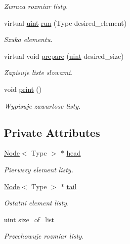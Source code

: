 \begin{DoxyCompactItemize}
\begin{DoxyCompactList}\small\item\em Zwraca rozmiar listy. \end{DoxyCompactList}\item 
virtual \hyperlink{_i_lista_8h_a91ad9478d81a7aaf2593e8d9c3d06a14}{uint} \hyperlink{class_lista_a5b2885df007727df930fc293ef2ab2b2}{run} (Type desired\-\_\-element)
\begin{DoxyCompactList}\small\item\em Szuka elementu. \end{DoxyCompactList}\item 
virtual void \hyperlink{class_lista_a28b2f7513f4ec6596463f2b60f2a753b}{prepare} (\hyperlink{_i_lista_8h_a91ad9478d81a7aaf2593e8d9c3d06a14}{uint} desired\-\_\-size)
\begin{DoxyCompactList}\small\item\em Zapisuje liste slowami. \end{DoxyCompactList}\item 
void \hyperlink{class_lista_acfeb35d442b628fbcfb4db31e6acea16}{print} ()
\begin{DoxyCompactList}\small\item\em Wypisuje zawartosc listy. \end{DoxyCompactList}\end{DoxyCompactItemize}
\subsection*{Private Attributes}
\begin{DoxyCompactItemize}
\item 
\hyperlink{class_node}{Node}$<$ Type $>$ $\ast$ \hyperlink{class_lista_a9024fb7afb23ca1658288623fb940727}{head}
\begin{DoxyCompactList}\small\item\em Pierwszy element listy. \end{DoxyCompactList}\item 
\hyperlink{class_node}{Node}$<$ Type $>$ $\ast$ \hyperlink{class_lista_a510db6c07e6aa5802176451632f6bf4c}{tail}
\begin{DoxyCompactList}\small\item\em Ostatni element listy. \end{DoxyCompactList}\item 
\hyperlink{_i_lista_8h_a91ad9478d81a7aaf2593e8d9c3d06a14}{uint} \hyperlink{class_lista_a2ccdeaf5854898d0ba0fce725e0fa676}{size\-\_\-of\-\_\-list}
\begin{DoxyCompactList}\small\item\em Przechowuje rozmiar listy. \end{DoxyCompactList}\end{DoxyCompactItemize}
